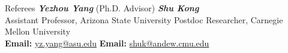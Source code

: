 \documentclass{resume} %
\begin{document}
\begin{rSection}{Referees}
\textbf{\textit{Yezhou Yang}} (Ph.D. Advisor) \hspace{27mm} {\textbf{\textit{Shu Kong}}}\\
Assistant Professor, Arizona State University \hfill  Postdoc Researcher, Carnegie Mellon University\\
\textbf{Email: }\url{yz.yang@asu.edu} \hspace{36.7mm} \textbf{Email: } \url{shuk@andew.cmu.edu} \\


\end{rSection}
\end{document}
